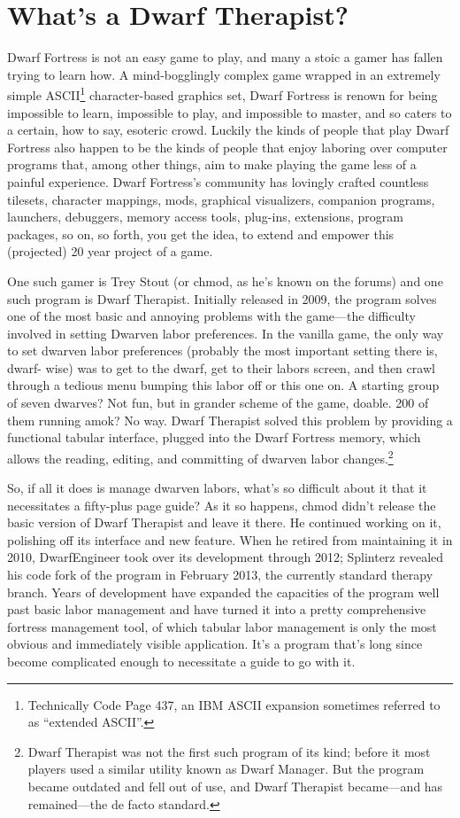 \documentclass[]{article}
\begin{document}
\section{What's a Dwarf Therapist?}

Dwarf Fortress is not an easy game to play, and many a stoic a gamer has fallen trying to learn how. A
mind-bogglingly complex game wrapped in an extremely simple ASCII\footnote{Technically Code Page 437, an
IBM ASCII expansion sometimes referred to as ``extended ASCII''.} character-based graphics set, Dwarf
Fortress is renown for being impossible to learn, impossible to play, and impossible to master, and so
caters to a certain, how to say, esoteric crowd.
Luckily the kinds of people that play Dwarf Fortress also happen to be the kinds of people that enjoy
laboring over computer programs that, among other things, aim to make playing the game less of a painful
experience. Dwarf Fortress's community has lovingly crafted countless tilesets, character
mappings, mods, graphical visualizers, companion programs, launchers, debuggers, memory access tools,
plug-ins, extensions, program packages, so on, so forth, you get the idea, to extend and empower this
(projected) 20 year project of a game.

One such gamer is Trey Stout (or chmod, as he's known on the forums) and one such program is Dwarf
Therapist. Initially released in 2009, the program solves one of the most basic and annoying
problems with the game---the difficulty involved in setting Dwarven labor preferences. In the vanilla
game, the only way to set dwarven labor preferences (probably the most important setting there is, dwarf-
wise) was to get to the dwarf, get to their labors screen, and then crawl through a tedious menu bumping
this labor off or this one on.
A starting group of seven dwarves? Not fun, but in grander scheme of the game, doable. 200 of them
running amok? No way. Dwarf Therapist solved this problem  by providing a functional tabular
interface, plugged into the Dwarf Fortress memory, which allows the reading, editing, and committing of
dwarven labor changes.\footnote{Dwarf Therapist was not the first such program of its kind; before it
most players used a similar utility known as Dwarf Manager. But the program became outdated and fell out
of use, and Dwarf Therapist became---and has remained---the de facto standard.}

So, if all it does is manage dwarven labors, what's so difficult about it that it necessitates a
fifty-plus page guide? As it so happens, chmod didn't release the basic version of Dwarf Therapist and
leave it there. He continued working on it, polishing off its interface and new feature. When
he retired from maintaining it in 2010, DwarfEngineer took over its development through 2012; Splinterz
revealed his code fork of the program in February 2013, the currently standard therapy branch. Years of
development have expanded the capacities of the program well past basic labor management and have turned
it into a pretty comprehensive fortress management tool, of which tabular labor management is only the
most obvious and immediately visible application. It's a program that's long since become complicated
enough to necessitate a guide to go with it.
\end{document}
